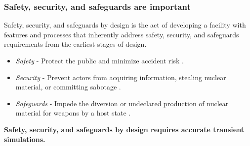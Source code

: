 \begin{frame}
  \frametitle{Safety, security, and safeguards are important}
        Safety, security, and safeguards by design is the act of developing a facility with features and processes that inherently address safety, security, and safeguards requirements from the earliest stages of design.
        \begin{itemize}
            \item \textit{Safety} - Protect the public and minimize accident risk \cite{international2000iaea}.
            \item \textit{Security} - Prevent actors from acquiring information, stealing nuclear material, or committing sabotage \cite{protection2011evaluation}.
            \item \textit{Safeguards} - Impede the diversion or undeclared production of nuclear material for weapons by a host state \cite{IAEA2002Proliferation}.
        \end{itemize}

        \textbf{Safety, security, and safeguards by design requires accurate transient simulations.}
\end{frame}